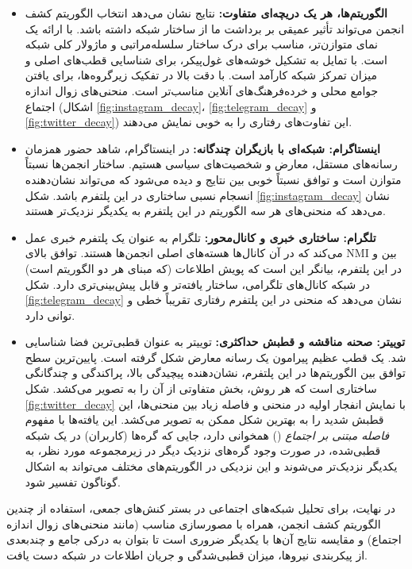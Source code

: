 \documentclass{article}
\begin{document}
	\begin{itemize}
		\item \textbf{الگوریتم‌ها، هر یک دریچه‌ای متفاوت:} نتایج نشان می‌دهد انتخاب الگوریتم کشف انجمن می‌تواند تأثیر عمیقی بر برداشت ما از ساختار شبکه داشته باشد.  با ارائه یک نمای متوازن‌تر، مناسب برای درک ساختار سلسله‌مراتبی و ماژولار کلی شبکه است.  با تمایل به تشکیل خوشه‌های غول‌پیکر، برای شناسایی قطب‌های اصلی و میزان تمرکز شبکه کارآمد است.  با دقت بالا در تفکیک زیرگروه‌ها، برای یافتن جوامع محلی و خرده‌فرهنگ‌های آنلاین مناسب‌تر است. منحنی‌های زوال اندازه اجتماع (اشکال \ref{fig:instagram_decay}، \ref{fig:telegram_decay} و \ref{fig:twitter_decay}) این تفاوت‌های رفتاری را به خوبی نمایش می‌دهند.
		\item \textbf{اینستاگرام: شبکه‌ای با بازیگران چندگانه:} در اینستاگرام، شاهد حضور همزمان رسانه‌های مستقل، معارض و شخصیت‌های سیاسی هستیم. ساختار انجمن‌ها نسبتاً متوازن است و توافق نسبتاً خوبی بین نتایج  و  دیده می‌شود که می‌تواند نشان‌دهنده انسجام نسبی ساختاری در این پلتفرم باشد. شکل \ref{fig:instagram_decay} نشان می‌دهد که منحنی‌های هر سه الگوریتم در این پلتفرم به یکدیگر نزدیک‌تر هستند.
		\item \textbf{تلگرام: ساختاری خبری و کانال‌محور:} تلگرام به عنوان یک پلتفرم خبری عمل می‌کند که در آن کانال‌ها هسته‌های اصلی انجمن‌ها هستند. توافق بالای NMI بین  و  در این پلتفرم، بیانگر این است که پویش اطلاعات (که مبنای هر دو الگوریتم است) در شبکه کانال‌های تلگرامی، ساختار یافته‌تر و قابل پیش‌بینی‌تری دارد. شکل \ref{fig:telegram_decay} نشان می‌دهد که منحنی  در این پلتفرم رفتاری تقریباً خطی و توانی دارد.
		\item \textbf{توییتر: صحنه مناقشه و قطبش حداکثری:} توییتر به عنوان قطبی‌ترین فضا شناسایی شد. یک قطب عظیم پیرامون یک رسانه معارض شکل گرفته است. پایین‌ترین سطح توافق بین الگوریتم‌ها در این پلتفرم، نشان‌دهنده پیچیدگی بالا، پراکندگی و چندگانگی ساختاری است که هر روش، بخش متفاوتی از آن را به تصویر می‌کشد. شکل \ref{fig:twitter_decay} با نمایش انفجار اولیه در منحنی  و فاصله زیاد بین منحنی‌ها، این قطبش شدید را به بهترین شکل ممکن به تصویر می‌کشد. این یافته‌ها با مفهوم \textit{فاصله مبتنی بر اجتماع} () همخوانی دارد، جایی که گره‌ها (کاربران) در یک شبکه قطبی‌شده، در صورت وجود گره‌های نزدیک دیگر در زیرمجموعه مورد نظر، به یکدیگر نزدیک‌تر می‌شوند و این نزدیکی در الگوریتم‌های مختلف می‌تواند به اشکال گوناگون تفسیر شود.
	\end{itemize}
	
	در نهایت، برای تحلیل شبکه‌های اجتماعی در بستر کنش‌های جمعی، استفاده از چندین الگوریتم کشف انجمن، همراه با مصورسازی مناسب (مانند منحنی‌های زوال اندازه اجتماع) و مقایسه نتایج آن‌ها با یکدیگر ضروری است تا بتوان به درکی جامع و چندبعدی از پیکربندی نیروها، میزان قطبی‌شدگی و جریان اطلاعات در شبکه دست یافت.
\end{document}
